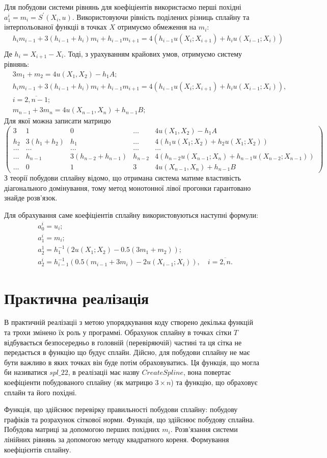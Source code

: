 \documentclass[titlepage]{article}
\newcommand\makelisting[1]{\begingroup\spacing{1} \vspace{1cm} \endgroup}
\newcommand\mysection[1]{\begingroup\center\section*{#1}\endgroup}
\newcommand\eq[1]{\begin{equation*}\begin{split}#1\end{split}\end{equation*}}
\begin{document}
Для побудови системи рівнянь для коефіціентів використаємо перші похідні $a_1^i = m_i = S^{'}(X_i, u)$. Використовуючи рівність поділених різниць сплайну та інтерпольованої функціі в точках $X$ отримуємо обмеження на $m_i$:
\eq{
&h_im_{i-1} + 3(h_{i-1} + h_i)m_i + h_{i-1}m_{i+1} = 4(h_{i-1}u(X_i; X_{i+1}) + h_iu(X_{i-1}; X_i))\\
}
Де $h_i = X_{i+1} - X_i$. Тоді, з урахуванням крайових умов, отримуємо систему рівнянь:
\eq{
&3m_1 + m_2 = 4u(X_1, X_2)-h_1A;\\
&h_im_{i-1} + 3(h_{i-1} + h_i)m_i + h_{i-1}m_{i+1} = 4(h_{i-1}u(X_i; X_{i+1}) + h_iu(X_{i-1}; X_i)),\\
& i = \overline{2,n-1};\\
&m_{n-1} + 3m_n = 4u(X_{n-1}, X_n) + h_{n-1}B;
}
Для якої можна записати матрицю
\[\left(\begin{array}{cccc|c}
3 & 1 & 0 & \ldots  & 4u(X_1, X_2)-h_1A\\
h_2 & 3(h_1 + h_2) & h_1 & \ldots & 4(h_{1}u(X_1; X_{2}) + h_2u(X_{1}; X_2)) \\
\ldots &\ldots &\ldots &\ldots & \ldots\\
\ldots &h_{n-1} & 3(h_{n-2} + h_{n- 1}) & h_{n-2} & 4(h_{n-2}u(X_{n-1}; X_{n}) + h_{n-1}u(X_{n-2}; X_{n-1}))\\
 \ldots & 0  & 1 & 3 & 4u(X_{n-1}, X_n) + h_{n-1}B
\end{array}\right)\]
З теорії побудови сплайну відомо, що отримана система матиме властивість діагонального домінування, тому метод монотонної лівої прогонки гарантовано знайде розв'язок.

Для обрахування саме коефіціентів сплайну використовуються наступні формули:
\eq{
&a_0^i = u_i;\\
&a_1^i = m_i;\\
&a_2^1 = h_1^{-1}(2u(X_1;X_2) - 0.5(3m_1+m_2));\\
&a_2^i = h_{i-1}^{-1}(0.5(m_{i-1}+3m_i) - 2u(X_{i-1}; X_i)), \quad i=\overline{2,n}.
}
\mysection{Практична реалізація}
В практичній реалізаціі з метою упорядкування коду створено декілька функцій та трохи змінено їх роль у программі. Обрахунок сплайну в точках сітки $T$ відбувається безпосередньо в головній (перевіряючій) частині та ця сітка не передається в функцію що будує сплайн. Дійсно, для побудови сплайну не має бути важливо в яких точках він буде потім обраховуватись. Ця функція, що могла би називатися $spl\_22$, в реалізаціі має назву $CreateSpline$, вона повертає коефіціенти побудованого сплайну (як матрицю $3\times n$) та функцію, що обраховує сплайн та його похідні. 

Функція, що здійснює перевірку правильності побудови сплайну: побудову графіків та розрахунок сіткової норми.
\makelisting{main.m}
Функція, що здійснює побудову сплайна.
\makelisting{CreateSpline.m}
Побудова матриці за допомогою перших похідних $m_i$.
\makelisting{CreateSEMatrix.m}
Розв'язання системи лінійних рівнянь за допомогою методу квадратного кореня.
\makelisting{SolveSE.m}
Формування коефіцієнтів сплайну.
\makelisting{FormSpline.m}
\end{document}
